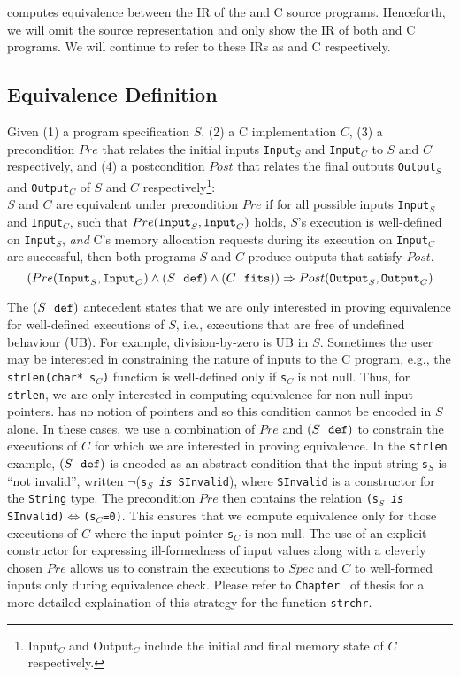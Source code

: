 \toolName{} computes equivalence between the IR
of the \SpecL{} and C source programs.
Henceforth, we will omit the source
representation and only show the IR of
both \SpecL{} and C programs.
We will continue to refer to these IRs
as \SpecL{} and C respectively.

\subsection{Equivalence Definition}
\label{sec:eqdef}
Given (1) a \SpecL{} program specification $S$, (2) a C implementation
$C$,
(3) a precondition $Pre$ that
relates the initial inputs {\tt Input}$_S$
and {\tt Input}$_C$ to
$S$ and $C$ respectively, and (4) a postcondition
$Post$ that relates the final outputs {\tt Output}$_S$
and {\tt Output}$_C$ of $S$ and $C$ respectively\footnote{{Input}$_C$ and {Output}$_C$ include the initial and final memory state of $C$ respectively.}:\\
$S$ and $C$ are equivalent under precondition $Pre$ if
for all possible inputs {\tt Input}$_S$
and {\tt Input}$_C$,
such that $Pre(\mathrm{\tt Input}_S, \mathrm{\tt Input}_C)$
holds,
$S$'s execution is
well-defined on {\tt Input}$_S$, {\em and} C's
memory allocation requests during its execution on
{\tt Input$_C$} are successful,
then both programs $S$ and $C$ produce outputs
that satisfy $Post$.
$$
(Pre(\mathrm{\tt Input}_S, \mathrm{\tt Input}_C) \land (S\ \  \mathrm{\tt def}) \land (C\ \ \mathrm{\tt fits})) \Rightarrow Post(\mathrm{\tt Output}_S, \mathrm{\tt Output}_C)
$$

The $(S\ \  \mathrm{\tt def})$ antecedent states that we are only
interested in proving equivalence for well-defined
executions of $S$, i.e., executions that are
free of undefined
behaviour (UB). For example, division-by-zero is UB
in $S$.
Sometimes
the user may be interested in constraining the nature of
inputs to the C program, e.g., the {\tt strlen(char* s$_C$)} function
is well-defined only if {\tt s$_C$} is not null.
Thus,
for {\tt strlen}, we are only interested in computing
equivalence for non-null input pointers. \SpecL{} has
no notion of pointers and so this condition cannot be encoded
in $S$ alone.
In these cases, we use a combination of
$Pre$ and $(S\ \  \mathrm{\tt def})$
to constrain the executions of $C$ for which we
are interested in proving equivalence. In the {\tt strlen} example,
$(S\ \  \mathrm{\tt def})$
is encoded as an
abstract condition that the input string {\tt s}$_S$ is ``not invalid'',
written $\neg$({\tt s$_S$ {\em is} SInvalid}), where {\tt SInvalid} is
a constructor for the \SpecL{} {\tt String} type.
The precondition $Pre$ then contains the relation {\tt (s$_S$ {\em is} SInvalid)$\Leftrightarrow$({\tt s$_C$}=0)}.
This ensures that we compute equivalence only for those executions
of $C$ where the input pointer {\tt s$_C$} is non-null.
The use of an explicit constructor for expressing ill-formedness
of \SpecL{} input values along with a cleverly chosen $Pre$ allows us
to constrain the executions to $Spec$ and $C$ to well-formed inputs
only during equivalence check.
Please refer to {\tt Chapter \ThesisChapterEval{}} of thesis for
a more detailed explaination of this strategy for
the function {\tt strchr}.

